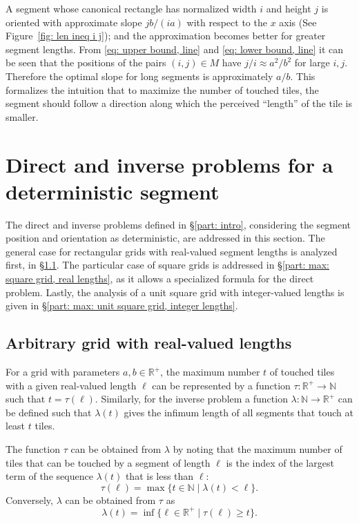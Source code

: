 \documentclass[12pt, a4paper]{article}
\newcommand{\st}{\mid}%
\newcommand{\funt}{\tau} %
\newcommand{\funl}{\lambda} %
\newcommand{\len}{\ell} %
\newcommand{\tiles}{t} %
\newcommand{\mss}{M}
\begin{document}
A segment whose canonical rectangle has normalized width $i$ and height $j$ is oriented with approximate slope $jb/(ia)$ with respect to the $x$ axis (See Figure~\ref{fig: len ineq i j}); and the approximation becomes better for greater segment lengths. From \eqref{eq: upper bound, line} and \eqref{eq: lower bound, line} it can be seen that the positions of the pairs $(i,j) \in \mss$ have $j/i \approx a^2/b^2$ for large $i, j$. Therefore the optimal slope for long segments is approximately $a/b$. This formalizes the intuition that to maximize the number of touched tiles, the segment should follow a direction along which the perceived ``length'' of the tile is smaller.


\section{Direct and inverse problems for a deterministic segment}
\label{part: max}

The direct and inverse problems defined in \S\ref{part: intro}, considering the segment position and orientation as deterministic, are addressed in this section. The general case for rectangular grids with real-valued segment lengths is analyzed first, in \S\ref{part: max: arbitrary grid, real lengths}. The particular case of square grids is addressed in \S\ref{part: max: square grid, real lengths}, as it allows a specialized formula for the direct problem. Lastly, the analysis of a unit square grid with integer-valued lengths is given in \S\ref{part: max: unit square grid, integer lengths}.


\subsection{Arbitrary grid with real-valued lengths}
\label{part: max: arbitrary grid, real lengths}

For a grid with parameters $a, b \in \mathbb R^+$, the maximum number $\tiles$ of touched tiles with a given real-valued length $\len$ can be represented by a function $\funt: \mathbb R^+ \to \mathbb N$ such that $\tiles = \funt(\len)$. Similarly, for the inverse problem a function $\funl: \mathbb N \to \mathbb R^+$ can be defined such that $\funl(\tiles)$ gives the infimum length of all segments that touch at least $\tiles$ tiles.

The function $\funt$ can be obtained from $\funl$ by noting that the maximum number of tiles that can be touched by a segment of length $\len$ is the index of the largest term of the sequence $\funl(\tiles)$ that is less than $\len$:
\begin{equation}
\label{eq: funt funl}
\funt(\len) = \max \{\tiles \in \mathbb N \st \funl(\tiles)<\len\}.
\end{equation}
Conversely, $\funl$ can be obtained from $\funt$ as
\begin{equation}
\label{eq: funl funt}
\funl(\tiles) = \inf\{\len \in \mathbb R^+ \st \funt(\len) \geq \tiles\}.
\end{equation}
\end{document}
